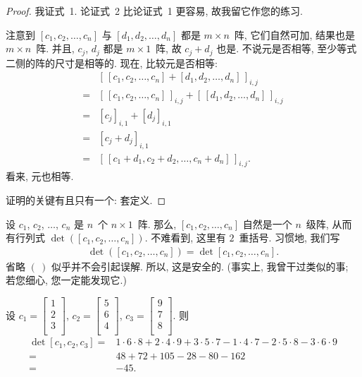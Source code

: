 \documentclass[%
    UTF8,%
    fontset=none,%
    punct=kaiming,%
    zihao=-4,%
    a4paper,%
    oneside,%
]{ctexbook}
\begin{document}
\begin{proof}
    我证式~1.
    论证式~2 比论证式~1 更容易,
    故我留它作您的练习.

    注意到 \([c_1, c_2, \dots, c_n]\)
    与 \([d_1, d_2, \dots, d_n]\)
    都是 \(m \times n\)~阵,
    它们自然可加,
    结果也是 \(m \times n\)~阵.
    并且, \(c_j\), \(d_j\) 都是 \(m \times 1\)~阵,
    故 \(c_j + d_j\) 也是.
    不说元是否相等, 至少等式二侧的阵的尺寸是相等的.
    现在, 比较元是否相等:
    \begin{align*}
             & [\, [c_1, c_2, \dots, c_n]
        + [d_1, d_2, \dots, d_n] \,]_{i,j}          \\
        = {} & [\, [c_1, c_2, \dots, c_n] \,]_{i,j}
        + [\, [d_1, d_2, \dots, d_n] \,]_{i,j}      \\
        = {} & [c_j]_{i,1} + [d_j]_{i,1}            \\
        = {} & [c_j + d_j]_{i,1}                    \\
        = {} & [\, [c_1 + d_1, c_2 + d_2, \dots,
                        c_n + d_n] \,]_{i,j}.
    \end{align*}
    看来, 元也相等.

    证明的关键有且只有一个: 套定义.
\end{proof}

设 \(c_1\), \(c_2\), \(\dots\), \(c_n\) 是
\(n\)~个 \(n \times 1\)~阵.
那么, \([c_1, c_2, \dots, c_n]\)
自然是一个 \(n\)~级阵,
从而有行列式
\(\det {([c_1, c_2, \dots, c_n])}\).
不难看到, 这里有 \(2\)~重括号.
习惯地, 我们写
\begin{align*}
    \det {([c_1, c_2, \dots, c_n])}
    =
    \det {[c_1, c_2, \dots, c_n]}.
\end{align*}
省略 \(( \ )\) 似乎并不会引起误解.
所以, 这是安全的.
(事实上, 我曾干过类似的事;
若您细心, 您一定能发现它.)

\begin{example}
    设
    \(c_1 =  \begin{bmatrix}
        1 \\2\\3\\
    \end{bmatrix}\),
    \(c_2 =  \begin{bmatrix}
        5 \\6\\4\\
    \end{bmatrix}\),
    \(c_3 =  \begin{bmatrix}
        9 \\7\\8\\
    \end{bmatrix}\).
    则
    \begin{align*}
        \det {[c_1, c_2, c_3]}
        = {} &
        1 \cdot 6 \cdot 8
        + 2 \cdot 4 \cdot 9
        + 3 \cdot 5 \cdot 7
        - 1 \cdot 4 \cdot 7
        - 2 \cdot 5 \cdot 8
        - 3 \cdot 6 \cdot 9
        \\
        = {} &
        48 + 72 + 105 - 28 - 80 - 162
        \\
        = {} & {-45}.
    \end{align*}
\end{example}
\end{document}

